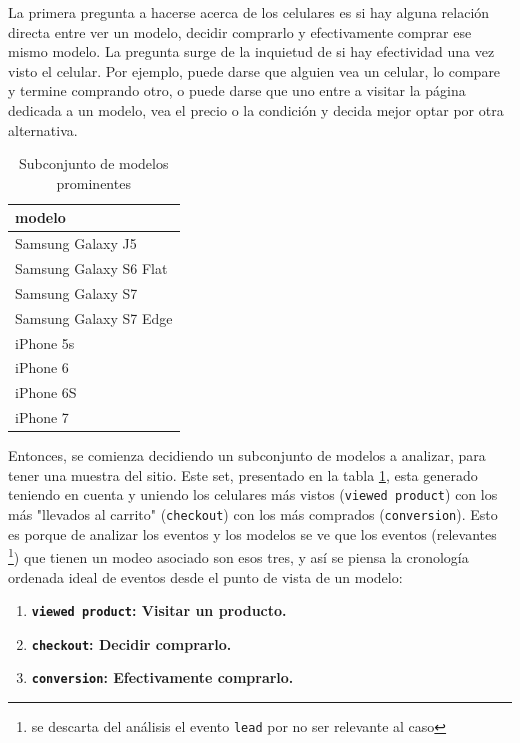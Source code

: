 \documentclass[a4paper]{article}
\begin{document}
La primera pregunta a hacerse acerca de los celulares es si hay alguna relación directa entre ver un modelo, decidir comprarlo y efectivamente comprar ese mismo modelo.  La pregunta surge de la inquietud de si hay efectividad una vez visto el celular. Por ejemplo, puede darse que alguien vea un celular, lo compare y termine comprando otro, o puede darse que uno entre a visitar la página dedicada a un modelo, vea el precio o la condición y decida mejor optar por otra alternativa.

\begin{table}[h!]
	\begin{center}
		\begin{tabular}{|l|}
			\hline
			modelo \\
			\hline \hline
			Samsung Galaxy J5 \\
			Samsung Galaxy S6 Flat \\
			Samsung Galaxy S7 \\
			Samsung Galaxy S7 Edge \\
			iPhone 5s \\
			iPhone 6 \\
			iPhone 6S \\
			iPhone 7
		\end{tabular}
		\caption{Subconjunto de modelos prominentes}
		\label{table:modelos_prominentes}
	\end{center}
\end{table}

Entonces, se comienza decidiendo un subconjunto de modelos a analizar, para tener una muestra del sitio. Este set, presentado en la tabla \ref{table:modelos_prominentes}, esta generado teniendo en cuenta y uniendo los celulares más vistos (\texttt{viewed product}) con los más "llevados al carrito" (\texttt{checkout}) con los más comprados (\texttt{conversion}). Esto es porque de analizar los eventos y los modelos se ve que los eventos (relevantes \footnote{se descarta del análisis el evento \texttt{lead} por no ser relevante al caso}) que tienen un modeo asociado son esos tres, y así se piensa la cronología ordenada ideal de eventos desde el punto de vista de un modelo:

\begin{enumerate}
\item \textbf{\texttt{viewed product}: Visitar un producto.}
\item \textbf{\texttt{checkout}: Decidir comprarlo.}
\item \textbf{\texttt{conversion}: Efectivamente comprarlo.}
\end{enumerate}
\end{document}
